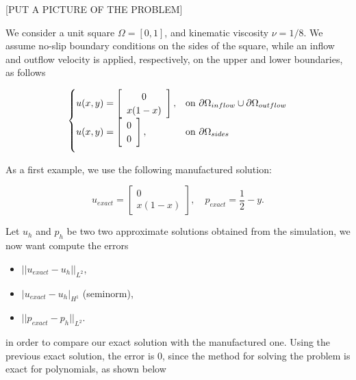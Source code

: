\documentclass[11pt,a4paper,titlepage]{report}
\begin{document}
[PUT A PICTURE OF THE PROBLEM]

We consider a unit square $\Omega = [0,1]$, and kinematic viscosity $\nu = 1/8$. We assume no-slip boundary conditions on the sides of the square, while an inflow and outflow velocity is applied, respectively, on the upper and lower boundaries, as follows

\[
\begin{cases}
u(x,y) = \left[ \begin{array}{c} 0 \\ x(1-x) \end{array} \right] , & \mbox{on } \partial \Omega_{inflow} \cup \partial \Omega_{outflow} \\

\vspace{.2cm}

u(x,y) = \left[ \begin{array}{c} 0 \\ 0 \end{array} \right], & \mbox{on } \partial \Omega_{sides}
\end{cases}
\]

As a first example, we use the following manufactured solution:

\[
u_{exact} = \left[ \begin{array}{c} 0 \\ x(1-x) \end{array} \right], \quad 
p_{exact} = \frac{1}{2}-y.
\]

Let $u_h$ and $p_h$ be two two approximate solutions obtained from the simulation, we now want compute the errors

\begin{itemize}
\item $|| u_{exact} - u_h ||_{L^2}$,
\item $ | u_{exact} - u_h |_{H^1}$ (seminorm),
\item $|| p_{exact} - p_h ||_{L^2} $.
\end{itemize}

in order to compare our exact solution with the manufactured one.
Using the previous exact solution, the error is 0, since the method for solving the problem is exact for polynomials, as shown below
\end{document}
